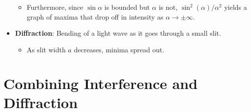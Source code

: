 \documentclass[../notes.tex]{subfiles}
\begin{document}
\begin{itemize}
\begin{itemize}
        \item Furthermore, since $\sin\alpha$ is bounded but $\alpha$ is not, $\sin^2(\alpha)/\alpha^2$ yields a graph of maxima that drop off in intensity as $\alpha\to\pm\infty$.
    \end{itemize}
    \item \textbf{Diffraction}: Bending of a light wave as it goes through a small slit.
    \begin{itemize}
        \item As slit width $a$ decreases, minima spread out.
    \end{itemize}
\end{itemize}



\section{Combining Interference and Diffraction}
\end{document}
